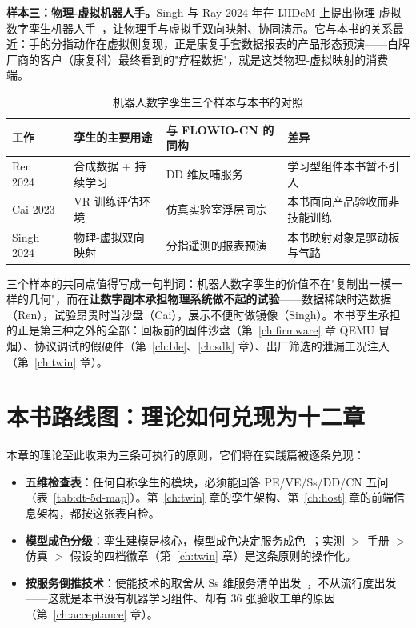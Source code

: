 \textbf{样本三：物理-虚拟机器人手。}Singh 与 Ray 2024 年在 IJIDeM 上提出物理-虚拟数字孪生机器人手~\cite{Singh2024}，让物理手与虚拟手双向映射、协同演示。它与本书的关系最近：手的分指动作在虚拟侧复现，正是康复手套数据报表的产品形态预演——白牌厂商的客户（康复科）最终看到的"疗程数据"，就是这类物理-虚拟映射的消费端。

\begin{table}[htbp]
  \centering
  \caption{机器人数字孪生三个样本与本书的对照}
  \label{tab:dt-robots}
  \begin{tabular}{lp{3.4cm}p{3.4cm}p{2.6cm}}
    \toprule
    工作 & 孪生的主要用途 & 与 FLOWIO-CN 的同构 & 差异 \\
    \midrule
    Ren 2024~\cite{Ren2024} & 合成数据 + 持续学习 & DD 维反哺服务 & 学习型组件本书暂不引入 \\
    Cai 2023~\cite{Cai2023} & VR 训练评估环境 & 仿真实验室浮层同宗 & 本书面向产品验收而非技能训练 \\
    Singh 2024~\cite{Singh2024} & 物理-虚拟双向映射 & 分指遥测的报表预演 & 本书映射对象是驱动板与气路 \\
    \bottomrule
  \end{tabular}
\end{table}

三个样本的共同点值得写成一句判词：机器人数字孪生的价值不在"复制出一模一样的几何"，而在\textbf{让数字副本承担物理系统做不起的试验}——数据稀缺时造数据（Ren），试验昂贵时当沙盘（Cai），展示不便时做镜像（Singh）。本书孪生承担的正是第三种之外的全部：回板前的固件沙盘（第~\ref{ch:firmware} 章 QEMU 冒烟）、协议调试的假硬件（第~\ref{ch:ble}、\ref{ch:sdk} 章）、出厂筛选的泄漏工况注入（第~\ref{ch:twin} 章）。

\section{本书路线图：理论如何兑现为十二章}
\label{sec:dt-roadmap}

本章的理论至此收束为三条可执行的原则，它们将在实践篇被逐条兑现：

\begin{itemize}
  \item \textbf{五维检查表}：任何自称孪生的模块，必须能回答 PE/VE/Ss/DD/CN 五问（表~\ref{tab:dt-5d-map}）。第~\ref{ch:twin} 章的孪生架构、第~\ref{ch:host} 章的前端信息架构，都按这张表自检。
  \item \textbf{模型成色分级}：孪生建模是核心，模型成色决定服务成色~\cite{Tao2022}；实测 $>$ 手册 $>$ 仿真 $>$ 假设的四档徽章（第~\ref{ch:twin} 章）是这条原则的操作化。
  \item \textbf{按服务倒推技术}：使能技术的取舍从 Ss 维服务清单出发~\cite{Qi2021}，不从流行度出发——这就是本书没有机器学习组件、却有 36 张验收工单的原因（第~\ref{ch:acceptance} 章）。
\end{itemize}

